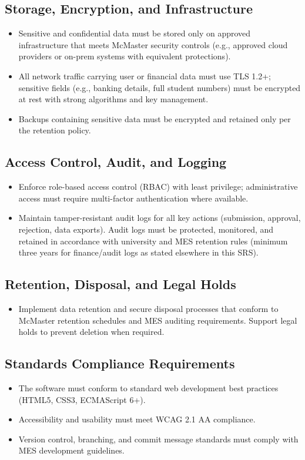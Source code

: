 \documentclass[12pt]{article}
\begin{document}
\subsection{Storage, Encryption, and Infrastructure}
\begin{itemize}
  \item Sensitive and confidential data must be stored only on approved infrastructure that meets McMaster security controls (e.g., approved cloud providers or on-prem systems with equivalent protections).
  \item All network traffic carrying user or financial data must use TLS 1.2+; sensitive fields (e.g., banking details, full student numbers) must be encrypted at rest with strong algorithms and key management.
  \item Backups containing sensitive data must be encrypted and retained only per the retention policy.
\end{itemize}

\subsection{Access Control, Audit, and Logging}
\begin{itemize}
  \item Enforce role-based access control (RBAC) with least privilege; administrative access must require multi-factor authentication where available.
  \item Maintain tamper-resistant audit logs for all key actions (submission, approval, rejection, data exports). Audit logs must be protected, monitored, and retained in accordance with university and MES retention rules (minimum three years for finance/audit logs as stated elsewhere in this SRS).
\end{itemize}

\subsection{Retention, Disposal, and Legal Holds}
\begin{itemize}
  \item Implement data retention and secure disposal processes that conform to McMaster retention schedules and MES auditing requirements. Support legal holds to prevent deletion when required.
\end{itemize}

\subsection{Standards Compliance Requirements}
\begin{itemize}
    \item The software must conform to standard web development best practices (HTML5, CSS3, ECMAScript 6+).
    \item Accessibility and usability must meet WCAG 2.1 AA compliance.
    \item Version control, branching, and commit message standards must comply with MES development guidelines.
\end{itemize}
\end{document}
